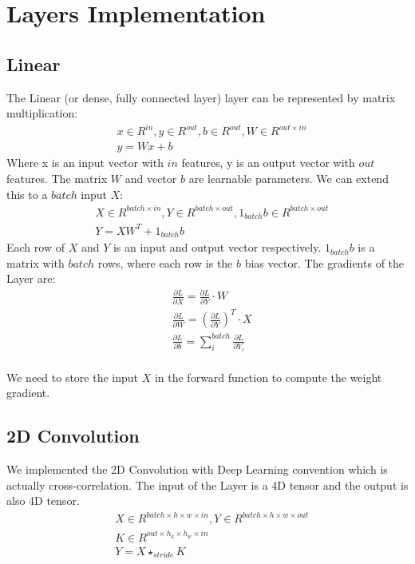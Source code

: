 \documentclass[conference]{IEEEtran}
\begin{document}
\section{Layers Implementation}
\subsection{Linear}
The Linear (or dense, fully connected layer) layer can be represented by matrix multiplication:
\begin{equation}
\begin{split}
&x \in R^{in}, y\in R^{out}, b\in R^{out}, W \in R^{out \times in} \\
&y = Wx + b
\end{split}
\end{equation}
Where x is an input vector with \(in\) features, y is an output vector with \(out\) features. The matrix \(W\) and vector \(b\) are learnable parameters. We can extend this to a \(batch\) input \(X\):
\begin{equation}
\begin{split}
&X \in R^{batch \times in}, Y \in R^{batch \times out}, 1_{batch}b \in R^{batch \times out} \\
&Y = XW^T + 1_{batch}b
\end{split}
\end{equation}
Each row of \(X\) and \(Y\) is an input and output vector respectively. \(1_{batch}b\) is a matrix with \(batch\) rows, where each row is the \(b\) bias vector. The gradients of the Layer are:
\begin{equation}
\begin{split}
&\frac{\partial L}{\partial X} = \frac{\partial L}{\partial Y}\cdot W \\
&\frac{\partial L}{\partial W} = (\frac{\partial L}{\partial Y})^T \cdot X\\
&\frac{\partial L}{\partial b} = \sum_i^{batch}\frac{\partial L}{\partial Y_i} \\
\end{split}
\end{equation}

We need to store the input \(X\) in the forward function to compute the weight gradient.

\subsection{2D Convolution}
We implemented the 2D Convolution with Deep Learning convention which is actually cross-correlation. The input of the Layer is a 4D tensor and the output is also 4D tensor.
\begin{equation}
\begin{split}
& X \in R^{batch \times h \times w \times in},
Y \in R^{batch \times h \times w \times out} \\
& K \in R^{out \times h_k \times h_w \times in} \\
&Y = X\star_{stride} K  
\end{split}
\end{equation}
\end{document}
